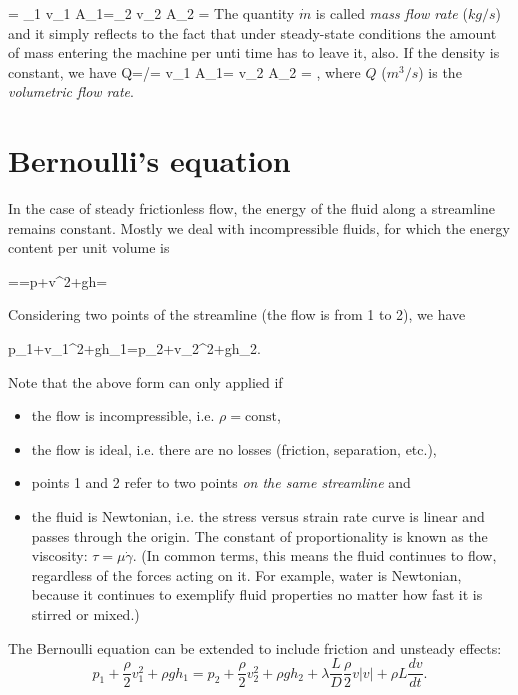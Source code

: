 \beq
{} = \rho_1 v_1 A_1=\rho_2 v_2 A_2 = 
\eeq
%
The quantity $\dot{m}$ is called \emph{mass flow rate} ($kg/s$) and it simply reflects to the fact that under steady-state conditions the amount of mass entering the machine per unti time has to leave it, also. If the density is constant, we have
%
\beq
Q=/\rho = v_1 A_1= v_2 A_2 = ,
\eeq
%
where $Q$ ($m^3/s$) is the \emph{volumetric flow rate}.
\section{Bernoulli's equation}

In the case of steady frictionless flow, the energy of the fluid along a streamline remains constant. Mostly we deal with incompressible fluids, for which the energy content per unit volume is

\beq
{}==p+v^2+\rho gh=
\eeq

Considering two points of the streamline (the flow is from 1 to 2), we have

\beq
p_1+v_1^2+\rho gh_1=p_2+v_2^2+\rho gh_2.
\eeq

Note that the above form can only applied if
\begin{itemize}
\item the flow is incompressible, i.e. $\rho=\text{const}$,
\item the flow is ideal, i.e. there are no losses (friction, separation, etc.),
\item points 1 and 2 refer to two points \emph{on the same streamline} and
\item the fluid is Newtonian, i.e. the stress versus strain rate curve is linear and passes through the origin. The constant of proportionality is known as the viscosity: $\tau=\mu \dot{\gamma}$. (In common terms, this means the fluid continues to flow, regardless of the forces acting on it. For example, water is Newtonian, because it continues to exemplify fluid properties no matter how fast it is stirred or mixed.)
\end{itemize}

The Bernoulli equation can be extended to include friction and unsteady effects:
%
\begin{equation}
p_1+\frac{\rho}{2}v_1^2+\rho gh_1=p_2+\frac{\rho}{2}v_2^2+\rho g h_2
  +\lambda \frac{L}{D}\frac{\rho}{2}v |v|+\rho L \frac{dv}{dt}.
\end{equation}

